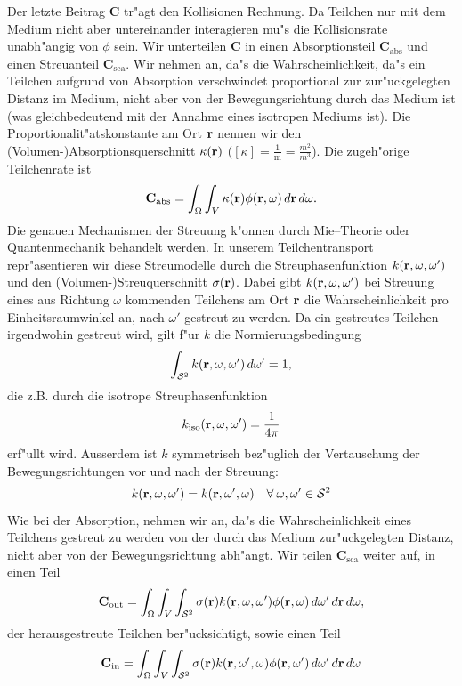 \documentclass[11pt,a4paper,DIVcalc,BCOR8mm,titlepage,twoside]{scrartcl}
\begin{document}
	Der letzte Beitrag $\mathbf{C}$ tr"agt den Kollisionen Rechnung. Da Teilchen nur mit dem Medium nicht aber untereinander interagieren mu"s die Kollisionsrate unabh"angig von $\phi$ sein. Wir unterteilen $\mathbf{C}$ in einen Absorptionsteil $\mathbf{C}_\text{abs}$ und einen Streuanteil $\mathbf{C}_\text{sca}$. Wir nehmen an, da"s die Wahrscheinlichkeit, da"s ein Teilchen aufgrund von Absorption verschwindet proportional zur zur"uckgelegten Distanz im Medium, nicht aber von der Bewegungsrichtung durch das Medium ist (was gleichbedeutend mit der Annahme eines isotropen Mediums ist). Die Proportionalit"atskonstante am Ort $\mathbf{r}$ nennen wir den (Volumen-)Absorptionsquerschnitt $\kappa(\mathbf{r})$ ($[\kappa]=\frac{1}{\text{m}}=\frac{m^2}{m^3}$). Die zugeh"orige Teilchenrate ist
	$$\mathbf{C}_\text{abs}=\int_\Omega \int_V \kappa(\mathbf{r})\phi(\mathbf{r},\omega)\,d\mathbf{r}\,d\omega.$$
	Die genauen Mechanismen der Streuung k"onnen durch Mie--Theorie oder Quantenmechanik behandelt werden. In unserem Teilchentransport repr"asentieren wir diese Streumodelle durch die Streuphasenfunktion $k(\mathbf{r},\omega,\omega')$ und den (Volumen-)Streuquerschnitt $\sigma(\mathbf{r})$. Dabei gibt $k(\mathbf{r},\omega,\omega')$ bei Streuung eines aus Richtung $\omega$ kommenden Teilchens am Ort $\mathbf{r}$ die Wahrscheinlichkeit pro Einheitsraumwinkel an, nach $\omega'$ gestreut zu werden. Da ein gestreutes Teilchen irgendwohin gestreut wird, gilt f"ur $k$ die Normierungsbedingung
	\begin{equation}\label{eq:k_norm_req}
	  \int_{\mathcal{S}^2} k(\mathbf{r},\omega,\omega')\,d\omega'=1,
	\end{equation}
	die z.B. durch die isotrope Streuphasenfunktion $$k_\text{iso}(\mathbf{r},\omega,\omega')=\frac{1}{4\pi}$$ erf"ullt wird. Ausserdem ist $k$ symmetrisch bez"uglich der Vertauschung der Bewegungsrichtungen vor und nach der Streuung:
	$$k(\mathbf{r},\omega,\omega')=k(\mathbf{r},\omega',\omega)\quad \forall\:\omega,\omega'\in\mathcal{S}^2$$
	Wie bei der Absorption, nehmen wir an, da"s die Wahrscheinlichkeit eines Teilchens gestreut zu werden von der durch das Medium zur"uckgelegten Distanz, nicht aber von der Bewegungsrichtung abh"angt. Wir teilen $\mathbf{C}_\text{sca}$ weiter auf, in einen Teil
	$$\mathbf{C}_\text{out}=\int_\Omega \int_V \int_{\mathcal{S}^2} \sigma{(\mathbf{r})}k(\mathbf{r},\omega,\omega')\phi(\mathbf{r},\omega)\,d\omega'\,d\mathbf{r}\,d\omega,$$
	der herausgestreute Teilchen ber"ucksichtigt, sowie einen Teil
	$$\mathbf{C}_\text{in}=\int_\Omega \int_V \int_{\mathcal{S}^2} \sigma{(\mathbf{r})}k(\mathbf{r},\omega',\omega)\phi(\mathbf{r},\omega')\,d\omega'\,d\mathbf{r}\,d\omega$$
\end{document}
